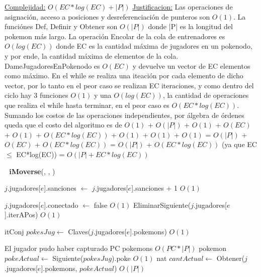 \begin{Algoritmos}
\begin{algorithm}[H]
\begin{algorithmic}[1]
\medskip
\State \underline{Complejidad:} $O(EC*log(EC) + |P|)$ 
\State \underline{Justificacion:} Las operaciones de asignaci\'on, acceso a posiciones y desreferenciaci\'on de punteros son $O(1)$. La funci\'ones Def, Definir y Obtener son $O(|P|)$ donde |P| es la longitud del pokemon m\'as largo. La operaci\'on Encolar de la cola de entrenadores es $O(log(EC))$ donde EC es la cantidad m\'axima de jugadores en un pokenodo, y por ende, la cantidad m\'axima de elementos de la cola. DameJugadoresEnPokenodo es $O(EC)$ y devuelve un vector de EC elementos como m\'aximo. En el while se realiza una iteaci\'on por cada elemento de dicho vector, por lo tanto en el peor caso se realizan EC iteraciones, y como dentro del ciclo hay 3 funciones $O(1)$ y una $O(log(EC))$, la cantidad de operaciones que realiza el while hasta terminar, en el peor caso es $O(EC*log(EC))$. Sumando los costos de las operaciones independientes, por \'algebra de \'ordenes queda que el costo del algoritmo es de $O(1)$ + $O(|P|)$ + $O(1)$ + $O(EC)$ + $O(1)$ + $O(EC*log(EC))$ + $O(1)$ + $O(1)$ + $O(1)$ = $O(|P|)$ + $O(EC)$ + $O(EC*log(EC))$ = $O(|P|)$ + $O(EC*log(EC))$ (ya que EC $\leq$ EC*log(EC)) = $O(|P| + EC*log(EC))$

\end{algorithmic}
\end{algorithm}


$ $\newline
$ $\newline
{\textbf{iMoverse}(, , )}
\begin{algorithmic}[1]

  
  \State $j$.jugadores[$e$].sanciones $\gets$ $j$.jugadores[$e$].sanciones $+$ 1 \Comment $O(1)$
  
  
    \State $j$.jugadores[$e$].conectado $\gets$ false \Comment $O(1)$
    \State EliminarSiguiente($j$.jugadores[$e$].iterAPos) \Comment $O(1)$
  
    \State itConj $pokesJug \gets$ Claves($j$.jugadores[$e$].pokemons) \Comment $O(1)$  
    
       \Comment El jugador pudo haber capturado PC pokemons $O(PC*|P|)$
      \State pokemon $pokeActual \gets$ Siguiente($pokesJug$).poke  \Comment $O(1)$
      \State nat $cantActual \gets$ Obtener($j$.jugadores[$e$].pokemons, $pokeActual$) \Comment $O(|P|)$
      

\end{algorithmic}
\end{Algoritmos}
